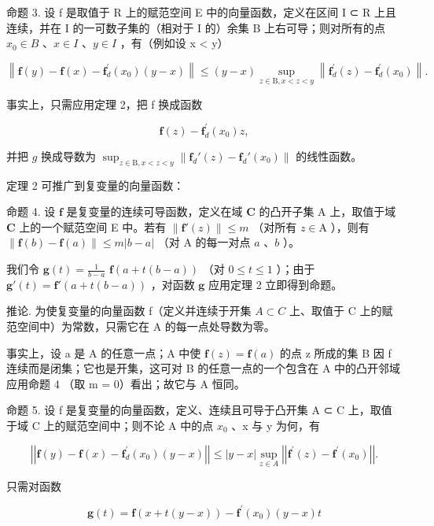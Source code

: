 命题 3. 设 f 是取值于 R 上的赋范空间 E 中的向量函数，定义在区间 I ⊂ R 上且连续，并在 I 的一可数子集的（相对于 I 的）余集 B 上右可导；则对所有的点 \(x_{0} \in B\) 、\(x \in I\) 、\(y \in I\) ，有（例如设 x \textless{} y）

\[
\left\| \mathbf {f} (y) - \mathbf {f} (x) - \mathbf {f} _ {d} ^ {\prime} (x _ {0}) (y - x) \right\| \leqslant (y - x) \sup _ {z \in \mathrm{B}, x <   z <   y} \left\| \mathbf {f} _ {d} ^ {\prime} (z) - \mathbf {f} _ {d} ^ {\prime} (x _ {0}) \right\|.\tag{9}
\]

事实上，只需应用定理 2，把 f 换成函数

\[
\mathbf {f} (z) - \mathbf {f} _ {d} ^ {\prime} (x _ {0}) z,
\]

并把 \(g\) 换成导数为 \(\sup_{z\in \mathrm{B}, x < z < y}\left\| \mathbf{f}_d'(z) - \mathbf{f}_d'(x_0)\right\|\) 的线性函数。

定理 2 可推广到复变量的向量函数：

命题 4. 设 \(\mathbf{f}\) 是复变量的连续可导函数，定义在域 \(\mathbf{C}\) 的凸开子集 A 上，取值于域 \(\mathbf{C}\) 上的一个赋范空间 E 中。若有 \(\| \mathbf{f}'(z)\| \leqslant m\) （对所有 \(z\in \mathrm{A}\) ），则有 \(\| \mathbf{f}(b) - \mathbf{f}(a)\| \leqslant m|b - a|\) （对 A 的每一对点 \(a\) 、\(b\) ）。

我们令 \(\mathbf{g}(t) = \frac{1}{b - a}\) \(\mathbf{f}(a + t(b - a))\) （对 \(0 \leqslant t \leqslant 1\) ）；由于 \(\mathbf{g}'(t) = \mathbf{f}'(a + t(b - a))\) ，对函数 \(\mathbf{g}\) 应用定理 2 立即得到命题。

推论. 为使复变量的向量函数 f（定义并连续于开集 \(A \subset C\) 上、取值于 C 上的赋范空间中）为常数，只需它在 A 的每一点处导数为零。

事实上，设 a 是 A 的任意一点；A 中使 \(\mathbf{f}(z) = \mathbf{f}(a)\) 的点 z 所成的集 B 因 f 连续而是闭集；它也是开集，这可对 B 的任意一点的一个包含在 A 中的凸开邻域应用命题 4 （取 m = 0）看出；故它与 A 恒同。

命题 5. 设 f 是复变量的向量函数，定义、连续且可导于凸开集 A ⊂ C 上，取值于域 C 上的赋范空间中；则不论 A 中的点 \(x_{0}\) 、x 与 y 为何，有

\[
\left| \left| \mathbf {f} (y) - \mathbf {f} (x) - \mathbf {f} _ {d} ^ {\prime} (x _ {0}) (y - x) \right| \right| \leqslant | y - x | \sup _ {z \in A} \left| \left| \mathbf {f} ^ {\prime} (z) - \mathbf {f} ^ {\prime} (x _ {0}) \right| \right|.\tag{10}
\]

只需对函数

\[
\mathbf {g} (t) = \mathbf {f} (x + t (y - x)) - \mathbf {f} ^ {\prime} (x _ {0}) (y - x) t
\]

